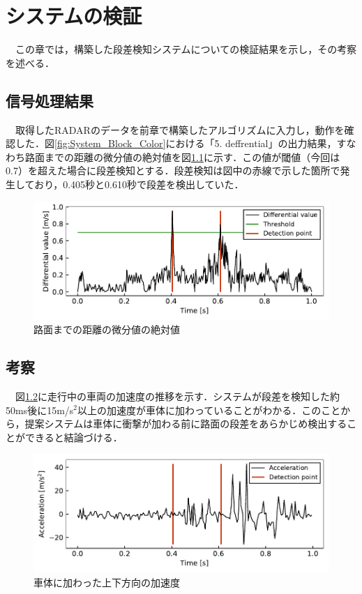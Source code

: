 \chapter{システムの検証}
　この章では，構築した段差検知システムについての検証結果を示し，その考察を述べる．

\section{信号処理結果}
　取得したRADARのデータを前章で構築したアルゴリズムに入力し，動作を確認した．図\ref{fig:System_Block_Color}における「5. deffrential」の出力結果，すなわち路面までの距離の微分値の絶対値を図\ref{fig:result_radar}に示す．この値が閾値（今回は0.7）を超えた場合に段差検知とする．段差検知は図中の赤線で示した箇所で発生しており，0.405秒と0.610秒で段差を検出していた．
\begin{figure}[H]
    \centering
    \includegraphics[width=11.5cm]{./fig/result_radar.pdf}
    \caption{路面までの距離の微分値の絶対値}
    \label{fig:result_radar}
\end{figure}

\section{考察}
　図\ref{fig:result_acc}に走行中の車両の加速度の推移を示す．システムが段差を検知した約50ms後に15m/s$^2$以上の加速度が車体に加わっていることがわかる．このことから，提案システムは車体に衝撃が加わる前に路面の段差をあらかじめ検出することができると結論づける．
\begin{figure}[H]
    \centering
    \includegraphics[width=11.5cm]{./fig/result_acc.pdf}
    \caption{車体に加わった上下方向の加速度}
    \label{fig:result_acc}
\end{figure}

